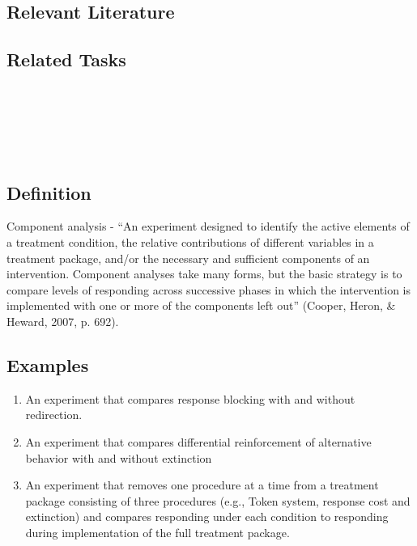 \subsection{Relevant Literature}
\begin{refsection}
\nocite{alexander1985effect,colon2012effects,iwata2000skill,johnston2010strategies}
\printbibliography[heading=none]
\end{refsection}
%                                                                   
\subsection{Related Tasks}
\fourbThree{}\\
\fourbSeven{}\\
\fourhOne{}\\
\fouriFive{}\\
%
%
%
%
%
\section[\fourbTen{}]{\fourbTen{}%
              }
\subsection{Definition}
Component analysis - ``An experiment designed to identify the active elements of a treatment condition, the relative contributions of different variables in a treatment package, and/or the necessary and sufficient components of an intervention. Component analyses take many forms, but the basic strategy is to compare levels of responding across successive phases in which the intervention is implemented with one or more of the components left out'' (Cooper, Heron, \& Heward, 2007, p. 692).
%
\subsection{Examples}
\begin{enumerate}
\item An experiment that compares response blocking with and without redirection. 
\item An experiment that compares differential reinforcement of alternative behavior with and without extinction
\item An experiment that removes one procedure at a time from a treatment package consisting of three procedures (e.g., Token system, response cost and extinction) and compares responding under each condition to responding during implementation of the full treatment package. 
\end{enumerate}
%
